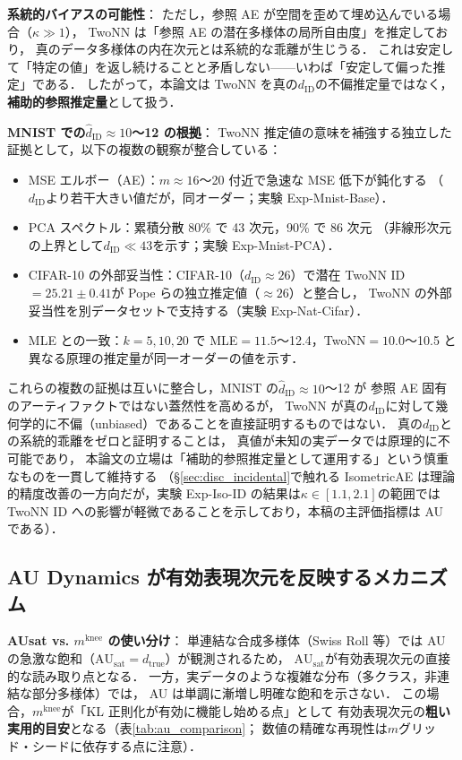 \documentclass[11pt,a4paper]{jsarticle}
\newcommand{\dtrue}{d_{\mathrm{true}}}
\newcommand{\kap}{\kappa}
\newcommand{\AUsat}{\mathrm{AU}_{\mathrm{sat}}}
\newcommand{\mknee}{m^{\mathrm{knee}}}
\begin{document}
\textbf{系統的バイアスの可能性}：
ただし，参照 AE が空間を歪めて埋め込んでいる場合（$\kappa \gg 1$），
TwoNN は「参照 AE の潜在多様体の局所自由度」を推定しており，
真のデータ多様体の内在次元とは系統的な乖離が生じうる．
これは安定して「特定の値」を返し続けることと矛盾しない——いわば「安定して偏った推定」である．
したがって，本論文は TwoNN を真の$d_\mathrm{ID}$の不偏推定量ではなく，
\textbf{補助的参照推定量}として扱う．

\textbf{MNIST での$\hat{d}_\mathrm{ID} \approx 10$〜12 の根拠}：
TwoNN 推定値の意味を補強する独立した証拠として，以下の複数の観察が整合している：
\begin{itemize}
  \item MSE エルボー（AE）：$m \approx 16$〜20 付近で急速な MSE 低下が鈍化する
        （$d_\mathrm{ID}$より若干大きい値だが，同オーダー；実験 Exp-Mnist-Base）．
  \item PCA スペクトル：累積分散 80\% で 43 次元，90\% で 86 次元
        （非線形次元の上界として$d_\mathrm{ID} \ll 43$を示す；実験 Exp-Mnist-PCA）．
  \item CIFAR-10 の外部妥当性：CIFAR-10（$d_\mathrm{ID} \approx 26$）で潜在 TwoNN ID$=25.21\pm0.41$が
        Pope ら\cite{pope2021intrinsic}の独立推定値（$\approx26$）と整合し，
        TwoNN の外部妥当性を別データセットで支持する（実験 Exp-Nat-Cifar）．
  \item MLE との一致：$k=5,10,20$ で MLE$=11.5$〜12.4，TwoNN$=10.0$〜10.5 と
        異なる原理の推定量が同一オーダーの値を示す．
\end{itemize}
これらの複数の証拠は互いに整合し，MNIST の$\hat{d}_\mathrm{ID} \approx 10$〜12 が
参照 AE 固有のアーティファクトではない蓋然性を高めるが，
TwoNN が真の$d_\mathrm{ID}$に対して幾何学的に不偏（unbiased）であることを直接証明するものではない．
真の$d_\mathrm{ID}$との系統的乖離をゼロと証明することは，
真値が未知の実データでは原理的に不可能であり，
本論文の立場は「補助的参照推定量として運用する」という慎重なものを一貫して維持する
（§\ref{sec:disc_incidental}で触れる IsometricAE は理論的精度改善の一方向だが，実験 Exp-Iso-ID の結果は$\kap \in [1.1, 2.1]$の範囲ではTwoNN ID への影響が軽微であることを示しており，本稿の主評価指標は AU である）．

\subsection{AU Dynamics が有効表現次元を反映するメカニズム}\label{sec:disc_au_dynamics}

\textbf{AUsat vs. $\mknee$ の使い分け}：
単連結な合成多様体（Swiss Roll 等）では AU の急激な飽和（$\AUsat = \dtrue$）が観測されるため，
$\AUsat$が有効表現次元の直接的な読み取り点となる．
一方，実データのような複雑な分布（多クラス，非連結な部分多様体）では，
AU は単調に漸増し明確な飽和を示さない．
この場合，$\mknee$が「KL 正則化が有効に機能し始める点」として
有効表現次元の\textbf{粗い実用的目安}となる（表\ref{tab:au_comparison}；
数値の精確な再現性は$m$グリッド・シードに依存する点に注意）．
\end{document}
